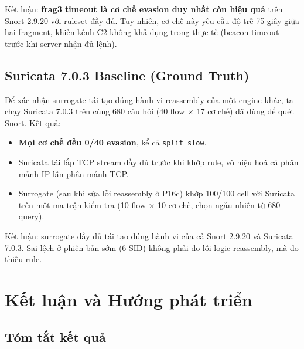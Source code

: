 \documentclass[12pt, a4paper, openany]{book}
\begin{document}
Kết luận: \textbf{frag3 timeout là cơ chế evasion duy nhất còn hiệu quả} trên Snort 2.9.20 với ruleset đầy đủ. Tuy nhiên, cơ chế này yêu cầu độ trễ 75 giây giữa hai fragment, khiến kênh C2 không khả dụng trong thực tế (beacon timeout trước khi server nhận đủ lệnh).

\section{Suricata 7.0.3 Baseline (Ground Truth)}

Để xác nhận surrogate tái tạo đúng hành vi reassembly của một engine khác, ta chạy Suricata 7.0.3 trên cùng 680 câu hỏi (40 flow × 17 cơ chế) đã dùng để quét Snort. Kết quả:

\begin{itemize}
    \item \textbf{Mọi cơ chế đều 0/40 evasion}, kể cả \texttt{split\_slow}.
    \item Suricata tái lắp TCP stream đầy đủ trước khi khớp rule, vô hiệu hoá cả phân mảnh IP lẫn phân mảnh TCP.
    \item Surrogate (sau khi sửa lỗi reassembly ở P16c) khớp 100/100 cell với Suricata trên một ma trận kiểm tra (10 flow × 10 cơ chế, chọn ngẫu nhiên từ 680 query).
\end{itemize}

Kết luận: surrogate đầy đủ tái tạo đúng hành vi của cả Snort 2.9.20 và Suricata 7.0.3. Sai lệch ở phiên bản sớm (6 SID) không phải do lỗi logic reassembly, mà do thiếu rule.

\chapter{Kết luận và Hướng phát triển}

\section{Tóm tắt kết quả}
\end{document}
